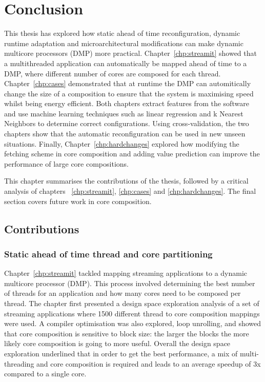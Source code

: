 \chapter{Conclusion}
This thesis has explored how static ahead of time reconfiguration, dynamic runtime adaptation and microarchitectural modifications can make dynamic multicore processors (DMP) more practical.
Chapter~\ref{chp:streamit} showed that a multithreaded application can automatically be mapped ahead of time to a DMP, where different number of cores are composed for each thread.
Chapter~\ref{chp:cases} demonstrated that at runtime the DMP can automitically change the size of a composition to ensure that the system is maximising speed whilst being energy efficient.
Both chapters extract features from the software and use machine learning techniques such as linear regression and k Nearest Neighbors to determine correct configurations.
Using cross-validation, the two chapters show that the automatic reconfiguration can be used in new unseen situations.
Finally, Chapter~\ref{chp:hardchanges} explored how modifying the fetching scheme in core composition and adding value prediction can improve the performance of large core compositions.

This chapter summarises the contributions of the thesis, followed by a critical analysis of chapters ~\ref{chp:streamit}, \ref{chp:cases} and \ref{chp:hardchanges}.
The final section covers future work in core composition.

\section{Contributions}

\subsection{Static ahead of time thread and core partitioning}

Chapter~\ref{chp:streamit} tackled mapping streaming applications to a dynamic multicore processor (DMP).
This process involved determining the best number of threads for an application and how many cores need to be composed per thread.
The chapter first presented a design space exploration analysis of a set of streaming applications where 1500 different thread to core composition mappings were used.
A compiler optimisation was also explored, loop unrolling, and showed that core composition is sensitive to block size: the larger the blocks the more likely core composition is going to more useful.
Overall the design space exploration underlined that in order to get the best performance, a mix of multi-threading and core composition is required and leads to an average speedup of 3x compared to a single core.
 

